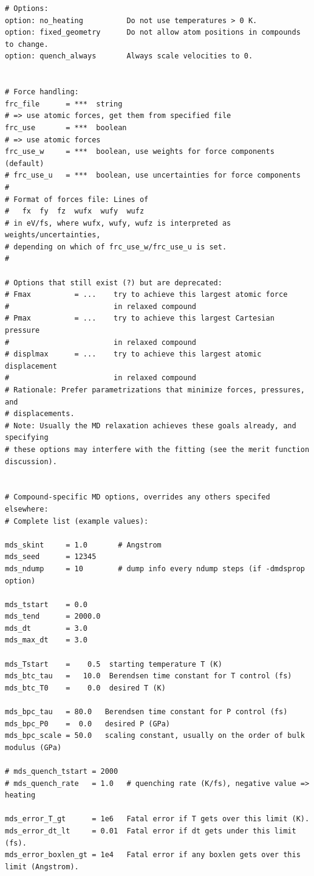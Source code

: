 \documentclass[a4paper,12pt,pdftex,onecolumn]{article}
\begin{document}
\begin{Verbatim}[fontsize=\relsize{-1},frame=single]
# Options:
option: no_heating          Do not use temperatures > 0 K.
option: fixed_geometry      Do not allow atom positions in compounds to change.
option: quench_always       Always scale velocities to 0.


# Force handling:
frc_file      = ***  string
# => use atomic forces, get them from specified file
frc_use       = ***  boolean
# => use atomic forces
frc_use_w     = ***  boolean, use weights for force components (default)
# frc_use_u   = ***  boolean, use uncertainties for force components
#
# Format of forces file: Lines of
#   fx  fy  fz  wufx  wufy  wufz
# in eV/fs, where wufx, wufy, wufz is interpreted as weights/uncertainties,
# depending on which of frc_use_w/frc_use_u is set.
#

# Options that still exist (?) but are deprecated:
# Fmax          = ...    try to achieve this largest atomic force
#                        in relaxed compound
# Pmax          = ...    try to achieve this largest Cartesian pressure
#                        in relaxed compound
# displmax      = ...    try to achieve this largest atomic displacement
#                        in relaxed compound
# Rationale: Prefer parametrizations that minimize forces, pressures, and
# displacements.
# Note: Usually the MD relaxation achieves these goals already, and specifying
# these options may interfere with the fitting (see the merit function discussion).


# Compound-specific MD options, overrides any others specifed elsewhere:
# Complete list (example values):

mds_skint     = 1.0       # Angstrom
mds_seed      = 12345
mds_ndump     = 10        # dump info every ndump steps (if -dmdsprop option)

mds_tstart    = 0.0
mds_tend      = 2000.0
mds_dt        = 3.0
mds_max_dt    = 3.0

mds_Tstart    =    0.5  starting temperature T (K)
mds_btc_tau   =   10.0  Berendsen time constant for T control (fs)
mds_btc_T0    =    0.0  desired T (K)

mds_bpc_tau   = 80.0   Berendsen time constant for P control (fs)
mds_bpc_P0    =  0.0   desired P (GPa)
mds_bpc_scale = 50.0   scaling constant, usually on the order of bulk modulus (GPa)

# mds_quench_tstart = 2000
# mds_quench_rate   = 1.0   # quenching rate (K/fs), negative value => heating

mds_error_T_gt      = 1e6   Fatal error if T gets over this limit (K).
mds_error_dt_lt     = 0.01  Fatal error if dt gets under this limit (fs).
mds_error_boxlen_gt = 1e4   Fatal error if any boxlen gets over this limit (Angstrom).

\end{Verbatim}
\end{document}
